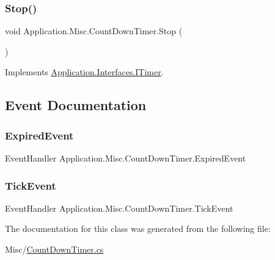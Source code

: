 \subsubsection{\texorpdfstring{Stop()}{Stop()}}
{\footnotesize\ttfamily void Application.\+Misc.\+Count\+Down\+Timer.\+Stop (\begin{DoxyParamCaption}{ }\end{DoxyParamCaption})}



Implements \mbox{\hyperlink{interface_application_1_1_interfaces_1_1_i_timer_a20bbfb25ff2343e0d3ea4b6ea708af90}{Application.\+Interfaces.\+I\+Timer}}.



\subsection{Event Documentation}
\mbox{\label{class_application_1_1_misc_1_1_count_down_timer_a6064d64a9bd2b1bb2ae734db384ffb46}} 
\subsubsection{\texorpdfstring{Expired\+Event}{ExpiredEvent}}
{\footnotesize\ttfamily Event\+Handler Application.\+Misc.\+Count\+Down\+Timer.\+Expired\+Event}

\mbox{\label{class_application_1_1_misc_1_1_count_down_timer_a8a28f9ffa8a36fc4c71918b554fdb397}} 
\subsubsection{\texorpdfstring{Tick\+Event}{TickEvent}}
{\footnotesize\ttfamily Event\+Handler Application.\+Misc.\+Count\+Down\+Timer.\+Tick\+Event}



The documentation for this class was generated from the following file\+:\begin{DoxyCompactItemize}
\item 
Misc/\mbox{\hyperlink{_count_down_timer_8cs}{Count\+Down\+Timer.\+cs}}\end{DoxyCompactItemize}

